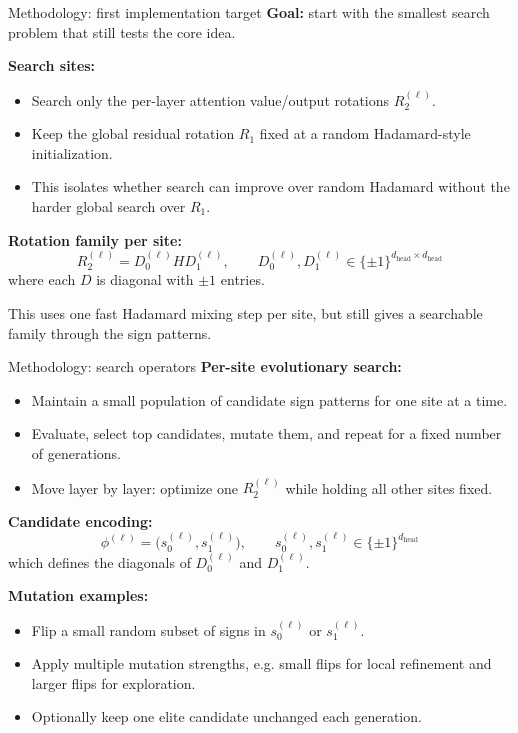 \documentclass[aspectratio=169,11pt]{beamer}
\begin{document}
\begin{frame}{Methodology: first implementation target}
\textbf{Goal:} start with the smallest search problem that still tests the core idea.

\vspace{0.2cm}
\textbf{Search sites:}
\begin{itemize}
  \item Search only the per-layer attention value/output rotations $R_2^{(\ell)}$.
  \item Keep the global residual rotation $R_1$ fixed at a random Hadamard-style initialization.
  \item This isolates whether search can improve over random Hadamard without the harder global search over $R_1$.
\end{itemize}

\vspace{0.2cm}
\textbf{Rotation family per site:}
\[
R_2^{(\ell)} = D_0^{(\ell)} H D_1^{(\ell)},
\qquad
D_0^{(\ell)}, D_1^{(\ell)} \in \{\pm1\}^{d_{\mathrm{head}}\times d_{\mathrm{head}}}
\]
where each $D$ is diagonal with $\pm 1$ entries.

\vspace{0.2cm}
This uses one fast Hadamard mixing step per site, but still gives a searchable family through the sign patterns.
\end{frame}

\begin{frame}{Methodology: search operators}
\textbf{Per-site evolutionary search:}
\begin{itemize}
  \item Maintain a small population of candidate sign patterns for one site at a time.
  \item Evaluate, select top candidates, mutate them, and repeat for a fixed number of generations.
  \item Move layer by layer: optimize one $R_2^{(\ell)}$ while holding all other sites fixed.
\end{itemize}

\vspace{0.2cm}
\textbf{Candidate encoding:}
\[
\phi^{(\ell)} = \bigl(s_0^{(\ell)}, s_1^{(\ell)}\bigr),
\qquad
s_0^{(\ell)}, s_1^{(\ell)} \in \{\pm1\}^{d_{\mathrm{head}}}
\]
which defines the diagonals of $D_0^{(\ell)}$ and $D_1^{(\ell)}$.

\vspace{0.2cm}
\textbf{Mutation examples:}
\begin{itemize}
  \item Flip a small random subset of signs in $s_0^{(\ell)}$ or $s_1^{(\ell)}$.
  \item Apply multiple mutation strengths, e.g. small flips for local refinement and larger flips for exploration.
  \item Optionally keep one elite candidate unchanged each generation.
\end{itemize}
\end{frame}
\end{document}
